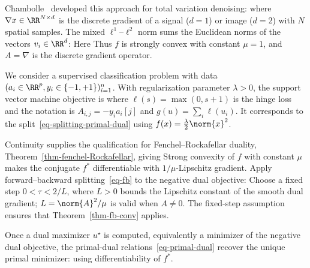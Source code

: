 \begin{exmp}[TV denoising]
Chambolle~\cite{chambolle-algo-tv} developed this approach for total variation denoising:
where $\nabla x \in \RR^{N \times d}$ is the discrete gradient of a signal ($d=1$) or image ($d=2$) with $N$ spatial samples. The mixed $\ell^1$--$\ell^2$ norm sums the Euclidean norms of the vectors $v_i\in\RR^d$:
Here 
Thus $f$ is strongly convex with constant $\mu=1$, and $A=\nabla$ is the discrete gradient operator.
\end{exmp}

\begin{exmp}
	We consider a supervised classification problem with data $(a_i \in \RR^p, y_i \in \{-1,+1\})_{i=1}^n$.
	With regularization parameter $\lambda>0$, the support vector machine objective is
	where $\ell(s) = \max(0,s+1)$ is the hinge loss and
	the notation is $A_{i,j}=-y_i a_i[j]$ and $g(u)=\sum_i\ell(u_i)$.
	It corresponds to the split~\eqref{eq-splitting-primal-dual} using $f(x) = \frac{\lambda}{2}\norm{x}^2$. 
\end{exmp}


Continuity supplies the qualification for Fenchel--Rockafellar duality, Theorem~\ref{thm-fenchel-Rockafellar}, giving
Strong convexity of $f$ with constant $\mu$ makes the conjugate $f^*$ differentiable with $1/\mu$-Lipschitz gradient. Apply forward--backward splitting~\eqref{eq-fb} to the negative dual objective:
Choose a fixed step $0<\tau<2/L$, where $L>0$ bounds the Lipschitz constant of the smooth dual gradient; $L=\norm{A}^2/\mu$ is valid when $A\neq0$. The fixed-step assumption ensures that Theorem~\ref{thm-fb-conv} applies.

Once a dual maximizer $u^\star$ is computed, equivalently a minimizer of the negative dual objective, the primal-dual relations~\eqref{eq-primal-dual} recover the unique primal minimizer:
using differentiability of $f^*$.


